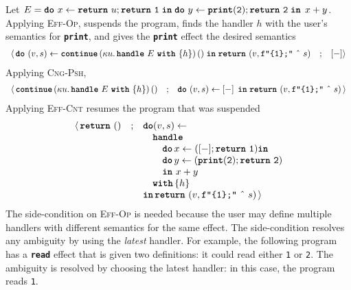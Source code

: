 Let $E = \texttt{\textbf{do}} \,\, {x} \leftarrow {\texttt{\textbf{return}} \,\, {u};\texttt{\textbf{return}} \,\, {\texttt{1}}} \; \textbf{\texttt{in}} \; {{\texttt{\textbf{do}} \,\, {y} \leftarrow {\texttt{\textbf{print}}(\texttt{2});\texttt{\textbf{return}} \,\, {\texttt{2}}} \; \textbf{\texttt{in}} \; {\, x + y}}}$. Applying \textsc{Eff-Op}, suspends the program, finds the handler $h$ with the user's semantics for \textbf{\texttt{print}}, and gives the \textbf{\texttt{print}} effect the desired semantics
{  \arraycolsep=3pt
\small
\[\begin{array}{rcl}
  \langle \, \texttt{\textbf{do}} \,\, {(v, s)} \leftarrow {\textbf{\texttt{continue}} \, {(\kappa{} u. \, \textbf{\texttt{handle}} \,\, {E} \,\, \textbf{\texttt{with}} \,\, \{{h}\})} \, {()}} \; \textbf{\texttt{in}} \; {\texttt{\textbf{return}} \,\, {(v, \texttt{f"\{1\};"} \text{ \^\ } s)}} &;& [-] \rangle
\end{array}
  \]
}
Applying \textsc{Cng-Psh},
{  \arraycolsep=3pt
\small
\[\begin{array}{rcl}
  \langle \, \textbf{\texttt{continue}} \, {(\kappa{} u. \, \textbf{\texttt{handle}} \,\, {E} \,\, \textbf{\texttt{with}} \,\, \{{h}\})} \, {()} &;& \texttt{\textbf{do}} \,\, {(v, s)} \leftarrow {[-]\,} \; \textbf{\texttt{in}} \; {\texttt{\textbf{return}} \,\, {(v, \texttt{f"\{1\};"} \text{ \^\ } s)}}\, \rangle
\end{array}
  \]
}
Applying \textsc{Eff-Cnt} resumes the program that was suspended
{  \arraycolsep=3pt
\small
\[\begin{array}{rcl}
  \langle \, \texttt{\textbf{return}} \,\, {()} &;& \textbf{\texttt{do}} {(v, s)} \leftarrow \\
  && \quad \textbf{\texttt{handle}} \\
  && \quad \quad \textbf{\texttt{do}} \, x \leftarrow ([-];\texttt{\textbf{return}} \,\, {\texttt{1}}) \textbf{\texttt{in}}\\
  && \quad \quad \textbf{\texttt{do}} \, y \leftarrow (\texttt{\textbf{print}}(\texttt{2});\texttt{\textbf{return}} \,\, {\texttt{2}})\\
  && \quad\quad \textbf{\texttt{in}} \, {\, x + y}\\
  && \quad \textbf{\texttt{with}} \, \{ h \}\\
  && \textbf{\texttt{in}} \, \texttt{\textbf{return}} \,\, {(v, \texttt{f"\{1\};"} \text{ \^\ } s)}  \, \rangle
\end{array}
  \]
}
The side-condition on \textsc{Eff-Op} is needed because the user may define multiple handlers with different semantics for the same effect. The side-condition resolves any ambiguity by using the \textit{latest} handler. For example, the following program has a \textbf{\texttt{read}} effect that is given two definitions: it could read either \texttt{1} or \texttt{2}. The ambiguity is resolved by choosing the latest handler: in this case, the program reads \texttt{1}.
